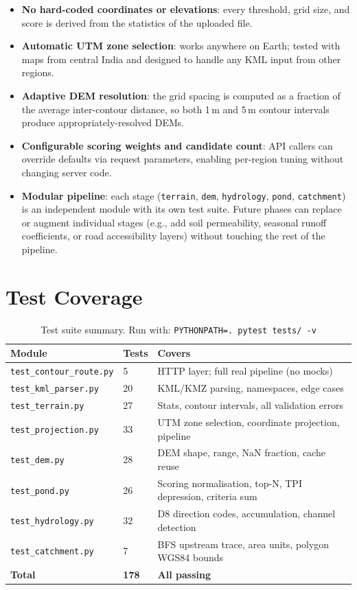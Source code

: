 \documentclass[12pt,a4paper]{article}
\begin{document}
\begin{itemize}
\item \textbf{No hard-coded coordinates or elevations}: every threshold, grid size, and score is derived from the statistics of the uploaded file.
\item \textbf{Automatic UTM zone selection}: works anywhere on Earth; tested with maps from central India and designed to handle any KML input from other regions.
\item \textbf{Adaptive DEM resolution}: the grid spacing is computed as a fraction of the average inter-contour distance, so both 1\,m and 5\,m contour intervals produce appropriately-resolved DEMs.
\item \textbf{Configurable scoring weights and candidate count}: API callers can override defaults via request parameters, enabling per-region tuning without changing server code.
\item \textbf{Modular pipeline}: each stage (\texttt{terrain}, \texttt{dem}, \texttt{hydrology}, \texttt{pond}, \texttt{catchment}) is an independent module with its own test suite. Future phases can replace or augment individual stages (e.g., add soil permeability, seasonal runoff coefficients, or road accessibility layers) without touching the rest of the pipeline.
\end{itemize}

\section{Test Coverage}

\begin{table}[H]
\centering
\begin{tabular}{@{}llp{8cm}@{}}
\toprule
\textbf{Module} & \textbf{Tests} & \textbf{Covers} \\
\midrule
\texttt{test\_contour\_route.py} & 5  & HTTP layer; full real pipeline (no mocks) \\
\texttt{test\_kml\_parser.py}    & 20 & KML/KMZ parsing, namespaces, edge cases \\
\texttt{test\_terrain.py}        & 27 & Stats, contour intervals, all validation errors \\
\texttt{test\_projection.py}     & 33 & UTM zone selection, coordinate projection, pipeline \\
\texttt{test\_dem.py}            & 28 & DEM shape, range, NaN fraction, cache reuse \\
\texttt{test\_pond.py}           & 26 & Scoring normalisation, top-N, TPI depression, criteria sum \\
\texttt{test\_hydrology.py}      & 32 & D8 direction codes, accumulation, channel detection \\
\texttt{test\_catchment.py}      & 7  & BFS upstream trace, area units, polygon WGS84 bounds \\
\midrule
\textbf{Total} & \textbf{178} & \textbf{All passing} \\
\bottomrule
\end{tabular}
\caption{Test suite summary. Run with: \texttt{PYTHONPATH=. pytest tests/ -v}}
\end{table}
\end{document}
